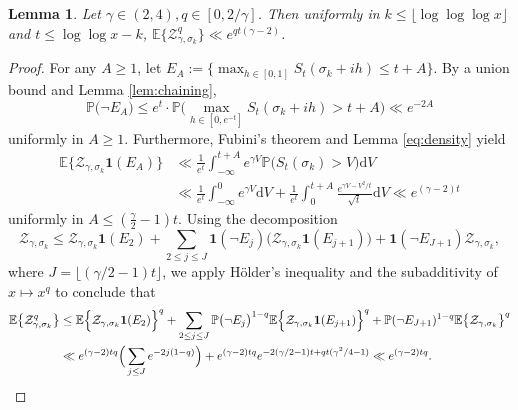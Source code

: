 \documentclass{amsart}
\newtheorem{lemma}[theorem]{Lemma}
\theoremstyle{definition}
\theoremstyle{remark}
\newtheorem{remark}[theorem]{Remark}
\numberwithin{equation}{section}
\begin{document}
\begin{lemma}\label{lem:crudesupercritical} Let $\gamma\in (2,4), q\in [0,2/\gamma]$. Then uniformly in $k\leq \lfloor \log\log\log x\rfloor$ and $t\leq \log\log x-k$, $\mathbb{E}\big\{\mathcal{Z}_{\gamma,\sigma_k}^q\big\} \ll e^{qt(\gamma-2)}$.
\end{lemma}
\begin{proof}
    For any $A\geq 1$, let $E_A:=\{\max_{h\in [0,1]}S_t(\sigma_k+ih)\leq t+A\}$. By a union bound and Lemma \ref{lem:chaining}, 
    \[
\mathbb{P}\big(\lnot E_A\big) \leq e^t \cdot \mathbb{P}\bigg(\max_{h\in[0,e^{-t}]} S_t(\sigma_k+ih)>t+A\bigg) \ll e^{-2A}
    \]
    uniformly in $A\geq 1$. Furthermore, Fubini's theorem and Lemma \ref{eq:density} yield
    \begin{align*}
        \mathbb{E}\Big\{\mathcal{Z}_{\gamma,\sigma_k} \mathbf{1}(E_A)\Big\} &\ll \frac{1}{e^t}\int_{-\infty}^{t+A}e^{\gamma V}\mathbb{P}\big(S_t(\sigma_k)>V\big)\mathrm{d}V \\ &\ll \frac{1}{e^t}\int_{-\infty}^0 e^{\gamma V}\mathrm{d}V+\frac{1}{e^t} \int_{0}^{t+A} \frac{e^{\gamma V-V^2/t}}{\sqrt{t}}\mathrm{d}V\ll e^{(\gamma-2)t}
    \end{align*}
    uniformly in $A\leq (\tfrac{\gamma}{2}-1)t$.
    Using the decomposition
    \[
            \mathcal{Z}_{\gamma,\sigma_k}\leq \mathcal{Z}_{\gamma,\sigma_k}\mathbf{1}(E_2)+\sum_{2\leq j\leq J} \mathbf{1}(\lnot E_j)\big(\mathcal{Z}_{\gamma,\sigma_k}\mathbf{1}(E_{j+1})\big)+\mathbf{1}(\lnot E_{J+1})\mathcal{Z}_{\gamma,\sigma_k},
    \]
    where $J=\lfloor (\gamma/2-1)t\rfloor$,
    we apply Hölder's inequality and the subadditivity of $x\mapsto x^q$ to conclude that
    \begin{align*}
        \mathbb{E}\big\{\mathcal{Z}_{\gamma,\sigma_k}^q\big\} 
            &\leq \mathbb{E}\Big\{\mathcal{Z}_{\gamma,\sigma_k} \mathbf{1}(E_2)\Big\}^q +\sum_{2\leq j\leq J}\mathbb{P}\big(\lnot E_j\big)^{1-q}\mathbb{E}\Big\{\mathcal{Z}_{\gamma,\sigma_k} \mathbf{1}(E_{j+1})\Big\}^q+\mathbb{P}(\lnot E_{J+1})^{1-q}\mathbb{E}\big\{\mathcal{Z}_{\gamma,\sigma_k}\big\}^q\\
        &\ll e^{(\gamma-2)tq}\Big(\sum_{j\leq J} e^{-2j(1-q)}\Big)+ e^{(\gamma-2)tq}e^{-2(\gamma/2-1)t+qt(\gamma^2/4-1)} \ll e^{(\gamma-2)tq}.  \qedhere
    \end{align*}
\end{proof}
\end{document}
